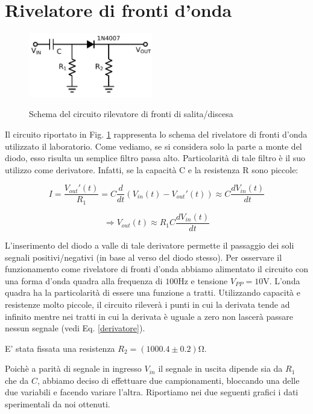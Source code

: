 \section{Rivelatore di fronti d'onda}
\begin{figure}
	\caption{Schema del circuito rilevatore di fronti di salita/discesa}
	\includegraphics[width=54mm]{schema_peak_detector.pdf}
	\label{fig:schema_peak_detector}
\end{figure}

Il circuito riportato in Fig. \ref{fig:schema_peak_detector} rappresenta lo schema del rivelatore di fronti d'onda utilizzato il laboratorio. Come vediamo, se si considera solo la parte a monte del diodo, esso risulta un semplice filtro passa alto. Particolarità di tale filtro è il suo utilizzo come derivatore. Infatti, se la capacità C e la resistenza R sono piccole:


$$ I=\frac{V_{out}'(t)}{R_1}=C\frac{d}{dt}(V_{in}(t)-V_{out}'(t)) \approx C \frac{dV_{in}(t)}{dt} $$

\begin{equation} 
\Rightarrow V_{out}(t) \approx R_1C \frac{dV_{in}(t)}{dt} 
\label{derivatore}
\end{equation}

L'inserimento del diodo a valle di tale derivatore permette il passaggio dei soli segnali positivi/negativi (in base al verso del diodo stesso). Per osservare il funzionamento come rivelatore di fronti d'onda abbiamo alimentato il circuito con una forma d'onda quadra alla frequenza di $100 \si{\hertz}$ e tensione $V_{PP}=10 \si{\volt}$. L'onda quadra ha la particolarità di essere una funzione a tratti. Utilizzando capacità e resistenze molto piccole, il circuito rileverà i punti in cui la derivata tende ad infinito mentre nei tratti in cui la derivata è uguale a zero non lascerà passare nessun segnale (vedi Eq. \ref{derivatore}).

E' stata fissata una resistenza $R_2=(1000.4 \pm 0.2) \si{\ohm}$. 

Poichè a parità di segnale in ingresso $V_{in}$ il segnale in uscita dipende sia da $R_1$ che da $C$, abbiamo deciso di effettuare due campionamenti, bloccando una delle due variabili e facendo variare l'altra. Riportiamo nei due seguenti grafici i dati sperimentali da noi ottenuti.



